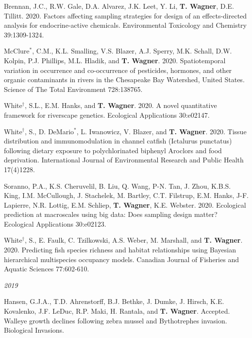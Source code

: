 \documentclass[10pt]{article}
\begin{document}
\begin{flushleft}
\begin{etaremune}[start=105]
\item Brennan, J.C., R.W. Gale, D.A. Alvarez, J.K. Leet, Y. Li, \textbf{T. Wagner}, D.E. Tillitt. 2020. Factors affecting sampling strategies for design of an effects-directed analysis for endocrine-active chemicals. Environmental Toxicology and Chemistry 39:1309-1324.

\item McClure$^*$, C.M., K.L. Smalling, V.S. Blazer, A.J. Sperry, M.K. Schall, D.W. Kolpin, P.J. Phillips, M.L. Hladik, and \textbf{T. Wagner}. 2020. Spatiotemporal variation in occurrence and co-occurrence of pesticides, hormones, and other organic contaminants in rivers in the Chesapeake Bay Watershed, United States. Science of The Total Environment 728:138765.

\item  White$^\dagger$, S.L., E.M. Hanks, and \textbf{T. Wagner}. 2020. A novel quantitative framework for riverscape genetics. Ecological Applications 30:e02147.

\item White$^\dagger$, S., D. DeMario$^*$, L. Iwanowicz, V. Blazer, and \textbf{T. Wagner}. 2020. Tissue distribution and immunomodulation in channel catfish (Ictalurus punctatus) following dietary exposure to polychlorinated biphenyl Aroclors and food deprivation. International Journal of Environmental Research and Public Health 17(4)1228.

\item Soranno, P.A., K.S. Cheruvelil, B. Liu, Q. Wang, P-N. Tan, J. Zhou, K.B.S. King, I.M. McCullough, J. Stachelek, M. Bartley, C.T. Filstrup, E.M. Hanks, J-F. Lapierre, N.R. Lottig, E.M. Schliep, \textbf{T. Wagner}, K.E. Webster. 2020. Ecological prediction at macroscales using big data: Does sampling design matter? Ecological Applications 30:e02123. 

\item White$^\dagger$, S., E. Faulk, C. Tzilkowski, A.S. Weber, M. Marshall, and \textbf{T. Wagner}. 2020. Predicting fish species richness and habitat relationships using Bayesian hierarchical multispecies occupancy models. Canadian Journal of Fisheries and Aquatic Sciences 77:602-610.
	
\end{etaremune}

\vspace{5pt}
\emph{2019}
\begin{etaremune}[start=91]


\item Hansen, G.J.A., T.D. Ahrenstorff, B.J. Bethke, J. Dumke, J. Hirsch, K.E. Kovalenko, J.F. LeDuc, R.P. Maki, H. Rantala, and \textbf{T. Wagner}. Accepted. Walleye growth declines following zebra mussel and Bythotrephes invasion. Biological Invasions.


\end{etaremune}
\end{flushleft}
\end{document}

